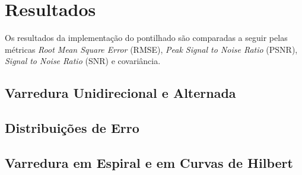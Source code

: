 \section{Resultados}

Os resultados da implementação do pontilhado são comparadas a seguir pelas métricas \textit{Root Mean Square Error} (RMSE), \textit{Peak Signal to Noise Ratio} (PSNR), \textit{Signal to Noise Ratio} (SNR) e covariância.

\subsection{Varredura Unidirecional e Alternada}
    {}

\subsection{Distribuições de Erro}
    

\subsection{Varredura em Espiral e em Curvas de Hilbert}
    

